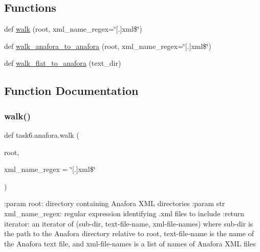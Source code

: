 \subsection*{Functions}
\begin{DoxyCompactItemize}
\item 
def \hyperlink{namespacetask6_1_1anafora_abb97d4716ebadd198d5a7cc1bf2d7bd0}{walk} (root, xml\+\_\+name\+\_\+regex=\char`\"{}\mbox{[}.\mbox{]}xml\$\char`\"{})
\item 
def \hyperlink{namespacetask6_1_1anafora_a2115457e498409fccbdf7ce1fd64027a}{walk\+\_\+anafora\+\_\+to\+\_\+anafora} (root, xml\+\_\+name\+\_\+regex=\char`\"{}\mbox{[}.\mbox{]}xml\$\char`\"{})
\item 
def \hyperlink{namespacetask6_1_1anafora_a805515fcdc638cb1994074e6450e498d}{walk\+\_\+flat\+\_\+to\+\_\+anafora} (text\+\_\+dir)
\end{DoxyCompactItemize}


\subsection{Function Documentation}
\mbox{\label{namespacetask6_1_1anafora_abb97d4716ebadd198d5a7cc1bf2d7bd0}} 
\subsubsection{\texorpdfstring{walk()}{walk()}}
{\footnotesize\ttfamily def task6.\+anafora.\+walk (\begin{DoxyParamCaption}\item[{}]{root,  }\item[{}]{xml\+\_\+name\+\_\+regex = {\ttfamily \char`\"{}\mbox{[}.\mbox{]}xml\$\char`\"{}} }\end{DoxyParamCaption})}

\begin{DoxyVerb}:param root: directory containing Anafora XML directories
:param str xml_name_regex: regular expression identifying .xml files to include
:return iterator: an iterator of (sub-dir, text-file-name, xml-file-names) where sub-dir is the path to the Anafora
    directory relative to root, text-file-name is the name of the Anafora text file, and xml-file-names is a list
    of names of Anafora XML files
\end{DoxyVerb}
 \mbox{\label{namespacetask6_1_1anafora_a2115457e498409fccbdf7ce1fd64027a}} 

